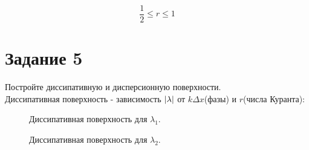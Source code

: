 \documentclass[a4paper, 14pt]{extreport}
\begin{document}
\begin{equation}
	\label{curant_cond}
	\frac{1}{2} \le r \le 1
\end{equation}

\newpage
\section*{Задание 5}
Постройте диссипативную и дисперсионную поверхности.\\
Диссипативная поверхность - зависимость $\abs{\lambda}$ от $k\Delta x$(фазы) и $r$(числа Куранта):

\begin{figure}[h]
\caption{Диссипативная поверхность для $\lambda_1$.}
\label{ris:dissipov1}
\end{figure}

\begin{figure}[h]
\caption{Диссипативная поверхность для $\lambda_2$.}
\label{ris:dissipov2}
\end{figure}
\end{document}

